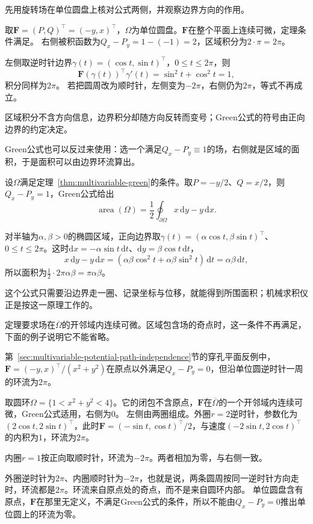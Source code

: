 先用旋转场在单位圆盘上核对公式两侧，并观察边界方向的作用。
\begin{example}[旋转场在单位圆盘上的Green公式]
\label{ex:analysis-rotation-field-green-disk}
取$\bm F=(P,Q)^\top=(-y,x)^\top$，$\Omega$为单位圆盘。$\bm F$在整个平面上连续可微，定理条件满足。
右侧被积函数为$Q_x-P_y=1-(-1)=2$，区域积分为$2\cdot\pi=2\pi$。

左侧取逆时针边界$\gamma(t)=(\cos t,\sin t)^\top$，$0\leq t\leq2\pi$，则
\[
 \bm F(\gamma(t))^\top\gamma'(t)=\sin^2t+\cos^2t=1 ,
\]
积分同样为$2\pi$。
若把圆周改为顺时针，左侧变为$-2\pi$，右侧仍为$2\pi$，等式不再成立。
\end{example}
区域积分不含方向信息，边界积分却随方向反转而变号；Green公式的符号由正向边界的约定决定。

Green公式也可以反过来使用：选一个满足$Q_x-P_y\equiv1$的场，右侧就是区域的面积，于是面积可以由边界环流算出。
\begin{example}[用边界计算面积]
\label{ex:analysis-green-area-formula}
设$\Omega$满足定理~\ref{thm:multivariable-green}的条件。取$P=-y/2$、$Q=x/2$，则$Q_x-P_y=1$，Green公式给出
\begin{equation}
 \operatorname{area}(\Omega)=\frac12\oint_{\partial\Omega}x\,\mathrm dy-y\,\mathrm dx.
 \label{eq:analysis-green-area-formula}
\end{equation}

对半轴为$\alpha,\beta>0$的椭圆区域，正向边界取$\gamma(t)=(\alpha\cos t,\beta\sin t)^\top$、$0\leq t\leq2\pi$。这时$\mathrm dx=-\alpha\sin t\,\mathrm dt$、$\mathrm dy=\beta\cos t\,\mathrm dt$，
\[
 x\,\mathrm dy-y\,\mathrm dx=(\alpha\beta\cos^2t+\alpha\beta\sin^2t)\,\mathrm dt=\alpha\beta\,\mathrm dt,
\]
所以面积为$\frac12\cdot2\pi\alpha\beta=\pi\alpha\beta$。
\end{example}
这个公式只需要沿边界走一圈、记录坐标与位移，就能得到所围面积；机械求积仪正是按这一原理工作的。

定理要求场在$\overline\Omega$的开邻域内连续可微。区域包含场的奇点时，这一条件不再满足，下面的例子说明它不能省略。
\begin{example}[有孔区域上的涡旋场]
\label{ex:analysis-annulus-vortex-green}
第~\ref{sec:multivariable-potential-path-independence}节的穿孔平面反例中，$\bm F=(-y,x)^\top/(x^2+y^2)$在原点以外满足$Q_x-P_y=0$，但沿单位圆逆时针一周的环流为$2\pi$。

取圆环$\Omega=\{1<x^2+y^2<4\}$。它的闭包不含原点，$\bm F$在$\overline\Omega$的一个开邻域内连续可微，Green公式适用，右侧为$0$。
左侧由两圈组成。外圈$r=2$逆时针，参数化为$(2\cos t,2\sin t)^\top$，此时$\bm F=(-\sin t,\cos t)^\top/2$，与速度$(-2\sin t,2\cos t)^\top$的内积为$1$，环流为$2\pi$。

内圈$r=1$按正向取顺时针，环流为$-2\pi$。两者相加为零，与右侧一致。
\end{example}
外圈逆时针为$2\pi$、内圈顺时针为$-2\pi$，也就是说，两条圆周按同一逆时针方向走时，环流都是$2\pi$。环流来自原点处的奇点，而不是来自圆环内部。
单位圆盘含有原点，$\bm F$在那里无定义，不满足Green公式的条件，所以不能由$Q_x-P_y=0$推出单位圆上的环流为零。

